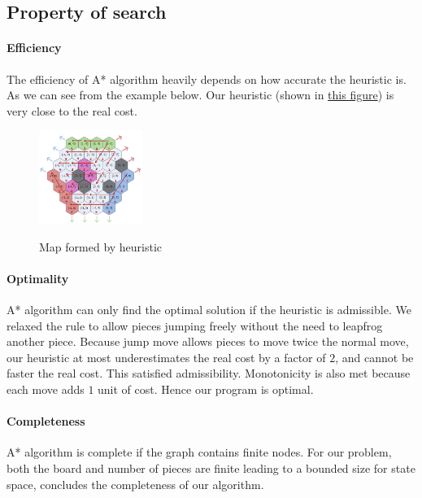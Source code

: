\documentclass[10.5pt,a4paper]{article}
\begin{document}
    \subsection{Property of search}
        \paragraph{Efficiency} The efficiency of A* algorithm heavily depends on how accurate the heuristic is. As we can see from the example below. Our heuristic (shown in \hyperref[fig:heurstics]{this figure}) is very close to the real cost.
        \begin{figure}
            \vspace{-32pt}
                \begin{center}
                    \includegraphics[width=0.3\textwidth]{heuristic.png}
                    \label{fig:heurstics}
                \end{center}
            \vspace{-10pt}
            \caption{Map formed by heuristic}
            \vspace{-100pt}
        \end{figure}
        \vspace{-40pt}
        \paragraph{Optimality} A* algorithm can only find the optimal solution if the heuristic is admissible. We relaxed the rule to allow pieces jumping freely without the need to leapfrog another piece. Because jump move allows pieces to move twice the normal move, our heuristic at most underestimates the real cost by a factor of $2$, and cannot be faster the real cost. This satisfied admissibility. Monotonicity is also met because each move adds $1$ unit of cost. Hence our program is optimal.
        \vspace{-10pt}
        \paragraph{Completeness} A* algorithm is complete if the graph contains finite nodes. For our problem, both the board and number of pieces are finite leading to a bounded size for state space, concludes the completeness of our algorithm.
\end{document}
